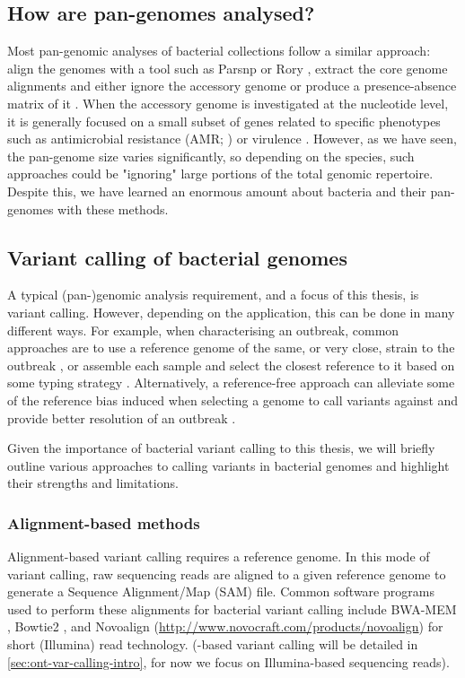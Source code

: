 \subsection{How are pan-genomes analysed?}
\label{sec:analyse-pangenome}

Most pan-genomic analyses of bacterial collections follow a similar approach: align the genomes with a tool such as Parsnp \cite{Treangen2014} or Rory \cite{Page2015}, extract the core genome alignments and either ignore the accessory genome or produce a presence-absence matrix of it \cite{Arnold2018,Azarian2018,McNally2016,thepangenome2020}. When the accessory genome is investigated at the nucleotide level, it is generally focused on a small subset of genes related to specific phenotypes such as antimicrobial resistance (AMR; \cite{Boolchandani2019}) or virulence \cite{Vasquez2019}. However, as we have seen, the pan-genome size varies significantly, so depending on the species, such approaches could be "ignoring" large portions of the total genomic repertoire. Despite this, we have learned an enormous amount about bacteria and their pan-genomes with these methods.

\subsection{Variant calling of bacterial genomes}
\label{sec:intro-bacteria-var-call}

A typical (pan-)genomic analysis requirement, and a focus of this thesis, is variant calling. However, depending on the application, this can be done in many different ways. For example, when characterising an outbreak, common approaches are to use a reference genome of the same, or very close, strain to the outbreak \cite{Taylor2015}, or assemble each sample and select the closest reference to it based on some typing strategy \cite{Wyres2021}. Alternatively, a reference-free approach can alleviate some of the reference bias induced when selecting a genome to call variants against and provide better resolution of an outbreak \cite{Cremers2020}.

Given the importance of bacterial variant calling to this thesis, we will briefly outline various approaches to calling variants in bacterial genomes and highlight their strengths and limitations.

\subsubsection{Alignment-based methods}
\label{sec:aln-var-call}
Alignment-based variant calling requires a reference genome. In this mode of variant calling, raw sequencing reads are aligned to a given reference genome to generate a Sequence Alignment/Map (SAM) file. Common software programs used to perform these alignments for bacterial variant calling include BWA-MEM \cite{li2013}, Bowtie2 \cite{bowtie2012}, and Novoalign (\url{http://www.novocraft.com/products/novoalign}) for short (Illumina) read technology. (\ont{}-based variant calling will be detailed in \autoref{sec:ont-var-calling-intro}, for now we focus on Illumina-based sequencing reads). 

